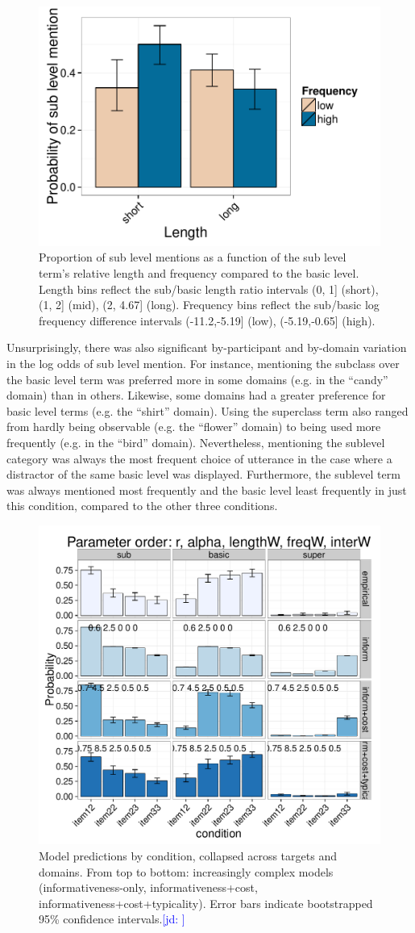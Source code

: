 \documentclass[10pt,letterpaper]{article}
\newcommand{\jd}[1]{\textcolor{Blue}{[jd: #1]}}
\newcommand{\figref}[1]{Figure \ref{#1}}
\begin{document}
\begin{figure}[ht!]
\centering
\includegraphics[width=.5\textwidth]{graphs/freq-length-interaction}
\caption{Proportion of sub level mentions  as a function of the sub level term's relative length and frequency compared to the basic level. Length bins reflect the sub/basic length ratio intervals (0, 1] (short), (1, 2] (mid), (2, 4.67] (long). Frequency bins reflect the sub/basic log frequency difference intervals (-11.2,-5.19] (low), (-5.19,-0.65] (high).}
\label{fig:lengthfreqinteraction}
\end{figure}


Unsurprisingly, there was also significant by-participant and by-domain variation in the log odds of sub level mention. %
For instance, mentioning the subclass over the basic level term was preferred more in some domains (e.g. in the ``candy'' domain) than in others. Likewise, some domains had a greater preference for basic level terms (e.g. the ``shirt'' domain). Using the superclass term also ranged from hardly being observable (e.g. the ``flower'' domain) to being used more frequently (e.g. in the ``bird'' domain). Nevertheless, mentioning the sublevel category was always the most frequent choice of utterance in the case where a distractor of the same basic level was displayed. Furthermore, the sublevel term was always mentioned most frequently and the basic level least frequently in just this condition, compared to the other three conditions.


\begin{figure}[ht!]
\centering
\includegraphics[width=.5\textwidth]{graphs/collapsed-pattern}
\caption{Model predictions by condition, collapsed across targets and domains. From top to bottom: increasingly complex models (informativeness-only, informativeness+cost, informativeness+cost+typicality). Error bars indicate bootstrapped 95\% confidence intervals.\jd{}}
\label{fig:qualitativemodel}
\end{figure}
\end{document}
